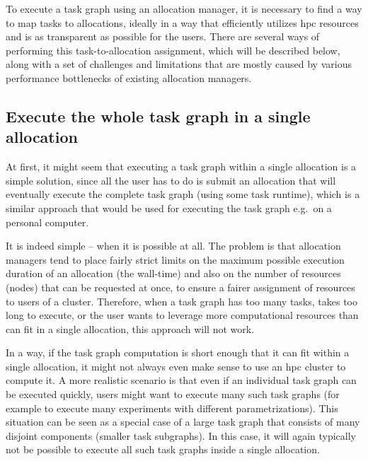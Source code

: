 To execute a task graph using an allocation manager, it is necessary to find a way to map tasks to
allocations, ideally in a way that efficiently utilizes \gls{hpc} resources and is
as transparent as possible for the users. There are several ways of performing this
task-to-allocation assignment, which will be described below, along with a set of challenges and
limitations that are mostly caused by various performance bottlenecks of existing allocation
managers.

\subsection*{Execute the whole task graph in a single allocation}
At first, it might seem that executing a task graph within a single allocation is a simple
solution, since all the user has to do is submit an allocation that will eventually execute the
complete task graph (using some task runtime), which is a similar approach that would be used for
executing the task graph e.g.\ on a personal computer.

It is indeed simple -- when it is possible at all. The problem is that allocation managers tend to
place fairly strict limits on the maximum possible execution duration of an allocation (the
wall-time) and also on the number of resources (nodes) that can be requested at once, to ensure a
fairer assignment of resources to users of a cluster. Therefore, when a task graph has too many
tasks, takes too long to execute, or the user wants to leverage more computational resources than
can fit in a single allocation, this approach will not work.

In a way, if the task graph computation is short enough that it can fit within a single allocation,
it might not always even make sense to use an \gls{hpc} cluster to compute it. A
more realistic scenario is that even if an individual task graph can be executed quickly, users
might want to execute many such task graphs (for example to execute many experiments with different
parametrizations). This situation can be seen as a special case of a large task graph that consists
of many disjoint components (smaller task subgraphs). In this case, it will again typically not be
possible to execute all such task graphs inside a single allocation.

